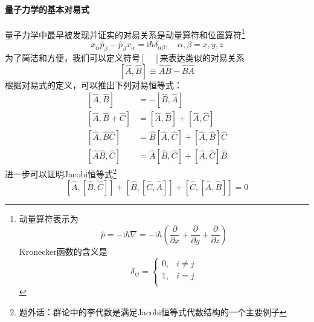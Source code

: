 \paragraph{量子力学的基本对易式}
量子力学中最早被发现并证实的对易关系是动量算符和位置算符\footnote{
    动量算符表示为
    $$
        \hat{p} = -\mathrm{i}\hbar\nabla
        = -\mathrm{i}\hbar\left(\frac{\partial }{\partial x} + \frac{\partial }{\partial y} + \frac{\partial }{\partial z}\right)
    $$
    Kronecker函数的含义是
    $$
        \delta_{ij}=\begin{cases}
            0, & i \neq j \\
            1, & i = j    \\
        \end{cases}
    $$
}
$$
    x_{\alpha}\hat{p}_{\beta}-\hat{p}_{\beta}x_{\alpha} = \mathrm{i}\hbar\delta_{\alpha\beta},
    \quad
    \alpha,\beta=x,y,z
$$
为了简洁和方便，我们可以定义符号$\left[\quad\right]$来表达类似的对易关系
\begin{equation}
    \left[\hat{A}, \hat{B}\right] \equiv \hat{A}\hat{B}-\hat{B}\hat{A}
\end{equation}
根据对易式的定义，可以推出下列对易恒等式：
\begin{align}
    \left[\hat{A}, \hat{B}\right]         & = -\left[\hat{B}, \hat{A}\right]                                              \\
    \left[\hat{A}, \hat{B}+\hat{C}\right] & = \left[\hat{A}, \hat{B}\right] + \left[\hat{A}, \hat{C}\right]               \\
    \left[\hat{A}, \hat{B}\hat{C}\right]  & = \hat{B}\left[\hat{A}, \hat{C}\right] + \left[\hat{A}, \hat{B}\right]\hat{C} \\
    \left[\hat{A}\hat{B}, \hat{C}\right]  & = \hat{A}\left[\hat{B}, \hat{C}\right] + \left[\hat{A}, \hat{C}\right]\hat{B}
\end{align}
进一步可以证明Jacobi恒等式\footnote{题外话：群论中的李代数是满足Jacobi恒等式代数结构的一个主要例子}
\begin{equation}
    \left[\hat{A}, \left[\hat{B},\hat{C}\right]\right] + \left[\hat{B}, \left[\hat{C},\hat{A}\right]\right] + \left[\hat{C}, \left[\hat{A},\hat{B}\right]\right] = 0
\end{equation}



